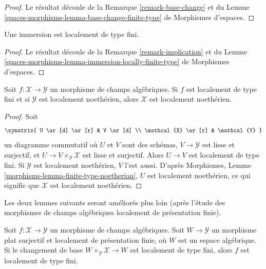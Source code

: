 \begin{proof}
Le résultat découle de la Remarque \ref{remark-base-change} et du
Lemme \ref{spaces-morphisms-lemma-base-change-finite-type} de Morphismes d'espaces.
\end{proof}

\begin{lemma}
\label{lemma-immersion-locally-finite-type}
Une immersion est localement de type fini.
\end{lemma}

\begin{proof}
Le résultat découle de la Remarque \ref{remark-implication} et du
Lemme \ref{spaces-morphisms-lemma-immersion-locally-finite-type} de Morphismes d'espaces.
\end{proof}

\begin{lemma}
\label{lemma-locally-finite-type-locally-noetherian}
Soit $f : \mathcal{X} \to \mathcal{Y}$ un morphisme de champs algébriques.
Si $f$ est localement de type fini et si $\mathcal{Y}$ est localement
noethérien, alors $\mathcal{X}$ est localement noethérien.
\end{lemma}

\begin{proof}
Soit
$$
\xymatrix{
U \ar[d] \ar[r] & V \ar[d] \\
\mathcal{X} \ar[r] & \mathcal{Y}
}
$$
un diagramme commutatif où $U$ et $V$ sont des schémas,
$V \to \mathcal{Y}$ est lisse et surjectif, et
$U \to V \times_\mathcal{Y} \mathcal{X}$ est lisse et surjectif.
Alors $U \to V$ est localement de type fini. Si $\mathcal{Y}$ est
localement noethérien, $V$ l'est aussi. D'après Morphismes, Lemme
\ref{morphisms-lemma-finite-type-noetherian}, $U$ est localement
noethérien, ce qui signifie que $\mathcal{X}$ est localement noethérien.
\end{proof}

\noindent
Les deux lemmes suivants seront améliorés plus loin (après l'étude des
morphismes de champs algébriques localement de présentation finie).

\begin{lemma}
\label{lemma-check-finite-type-covering}
Soit $f : \mathcal{X} \to \mathcal{Y}$ un morphisme de champs algébriques.
Soit $W \to \mathcal{Y}$ un morphisme plat surjectif et localement de
présentation finie, où $W$ est un espace algébrique. Si le changement
de base $W \times_\mathcal{Y} \mathcal{X} \to W$ est localement de
type fini, alors $f$ est localement de type fini.
\end{lemma}


